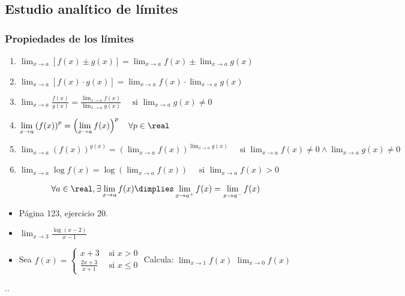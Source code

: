 \subsection{Estudio analítico de límites}

\subsubsection{Propiedades de los límites}

\begin{enumerate}
	\item $\displaystyle\lim_{x\to a} [f(x) \pm g(x)] = \lim_{x\to a} f(x) \pm \lim_{x\to a} g(x)$
	\item $\displaystyle\lim_{x\to a} [f(x) · g(x)] = \lim_{x\to a} f(x) · \lim_{x\to a} g(x)$
	\item $\displaystyle\lim_{x\to a} \frac{f(x)}{g(x)} = \frac{\lim_{x\to a} f(x)}{\lim_{x\to a} g(x)}\quad\text{ si }\displaystyle\lim_{x\to a} g(x) \neq 0$
	\item $\displaystyle\lim_{x\to a} \left(f(x)\right)^p = \left(\lim_{x\to a}f(x)\right)^p \quad \forall p\in\real$
	\item $\displaystyle\lim_{x\to a} \left(f(x)\right)^{g(x)} = \left(\lim_{x\to a}f(x)\right)^{\displaystyle\lim_{x\to a}g(x)} \quad\text{ si }\displaystyle \lim_{x\to a}f(x) \neq 0 \wedge \lim_{x\to a}g(x)\neq 0$
	\item $\displaystyle\lim_{x\to a}\log f(x) = \log\left(\displaystyle\lim_{x\to a}f(x)\right)\quad\text{ si } \lim_{x\to a}f(x) >0 $
\end{enumerate}

\begin{theorem}
\[\forall a\in \real, \exists \lim_{x\to a}f(x) \dimplies \lim_{x\to a^+} f(x) = \lim_{x\to a^-}f(x)\]
\end{theorem}

\begin{problem}
\begin{itemize}
	\item Página 123, ejercicio 20.
	\item $\displaystyle\lim_{x\to 3} \frac{\log(x-2)}{x-1}$
	\item \label{Analisis::EjemploContinuidad}Sea $f(x) = 
		\begin{cases}
		x+3 & \text{ si } x>0\\
		\frac{2x+3}{x+1}& \text{ si } x\leq 0 
		\end{cases}$ Calcula:
		\subitem $\displaystyle\lim_{x\to 1} f(x)$
		\subitem $\displaystyle\lim_{x\to 0} f(x)$
\end{itemize}
\solution

.\vspace{10cm}.

\end{problem}

